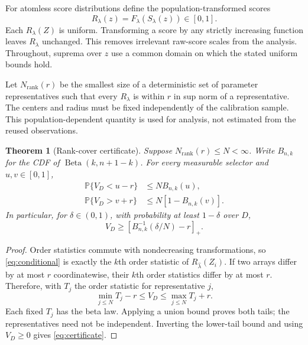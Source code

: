 \documentclass{article}
\newtheorem{theorem}{Theorem}
\newcommand{\PP}{\mathbb P}
\newcommand{\ranknet}{N_{\mathrm{rank}}}
\begin{document}
For atomless score distributions define the population-transformed scores
\begin{equation}
 R_\lambda(z)=F_\lambda(S_\lambda(z))\in[0,1].
\end{equation}
Each $R_\lambda(Z)$ is uniform. Transforming a score by any strictly increasing function leaves $R_\lambda$ unchanged. This removes irrelevant raw-score scales from the analysis. Throughout, suprema over $z$ use a common domain on which the stated uniform bounds hold.

Let $\ranknet(r)$ be the smallest size of a deterministic set of parameter representatives such that every $R_\lambda$ is within $r$ in sup norm of a representative. The centers and radius must be fixed independently of the calibration sample. This population-dependent quantity is used for analysis, not estimated from the reused observations.

\begin{theorem}[Rank-cover certificate]\label{thm:net}
Suppose $\ranknet(r)\le N<\infty$. Write $B_{n,k}$ for the CDF of $\operatorname{Beta}(k,n+1-k)$. For every measurable selector and $u,v\in[0,1]$,
\begin{align}
 \PP\{V_D<u-r\}&\le N B_{n,k}(u),\label{eq:lower}\\
 \PP\{V_D>v+r\}&\le N[1-B_{n,k}(v)].\label{eq:upper}
\end{align}
In particular, for $\delta\in(0,1)$, with probability at least $1-\delta$ over $D$,
\begin{equation}\label{eq:certificate}
 V_D\ge\left[B_{n,k}^{-1}(\delta/N)-r\right]_+.
\end{equation}
\end{theorem}

\begin{proof}
Order statistics commute with nondecreasing transformations, so \cref{eq:conditional} is exactly the $k$th order statistic of $R_{\hat\lambda}(Z_i)$. If two arrays differ by at most $r$ coordinatewise, their $k$th order statistics differ by at most $r$. Therefore, with $T_j$ the order statistic for representative $j$,
\begin{equation}\label{eq:bracket}
 \min_{j\le N}T_j-r\le V_D\le\max_{j\le N}T_j+r.
\end{equation}
Each fixed $T_j$ has the beta law. Applying a union bound proves both tails; the representatives need not be independent. Inverting the lower-tail bound and using $V_D\ge0$ gives \cref{eq:certificate}.
\end{proof}
\end{document}
